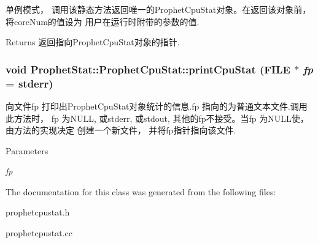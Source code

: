 \label{classProphetStat_1_1ProphetCpuStat_a1dfee1a62c17b8e9035b68563368702e}
单例模式， 调用该静态方法返回唯一的ProphetCpuStat对象。在返回该对象前， 将coreNum的值设为 用户在运行时附带的参数的值. \begin{DoxyReturn}{Returns}
返回指向ProphetCpuStat对象的指针. 
\end{DoxyReturn}
\hypertarget{classProphetStat_1_1ProphetCpuStat_a8343c003cef10d15351dbafcfc74962e}{
\subsubsection[{printCpuStat}]{\setlength{\rightskip}{0pt plus 5cm}void ProphetStat::ProphetCpuStat::printCpuStat (FILE $\ast$ {\em fp} = {\ttfamily stderr})}}
\label{classProphetStat_1_1ProphetCpuStat_a8343c003cef10d15351dbafcfc74962e}
向文件fp 打印出ProphetCpuStat对象统计的信息.fp 指向的为普通文本文件.调用此方法时， fp 为NULL, 或stderr, 或stdout, 其他的fp不接受。当fp 为NULL使， 由方法的实现决定 创建一个新文件， 并将fp指针指向该文件. 
\begin{DoxyParams}{Parameters}
\item[{\em fp}]\end{DoxyParams}


The documentation for this class was generated from the following files:\begin{DoxyCompactItemize}
\item 
prophetcpustat.h\item 
prophetcpustat.cc\end{DoxyCompactItemize}
